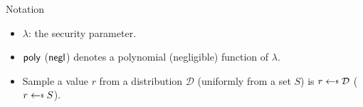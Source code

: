\begin{frame}{Notation}

\begin{itemize}
	\item $\lambda$: the security parameter.
	
	\item $\mathsf{poly}$ ($\mathsf{negl}$) denotes a polynomial (negligible) function of $\lambda$.

	\item Sample a value $r$ from a distribution $\mathcal{D}$ (uniformly from a set $S$) is $r \getsdollar \mathcal{D}$ ($r \getsdollar S$).

\end{itemize}
    
\end{frame}
